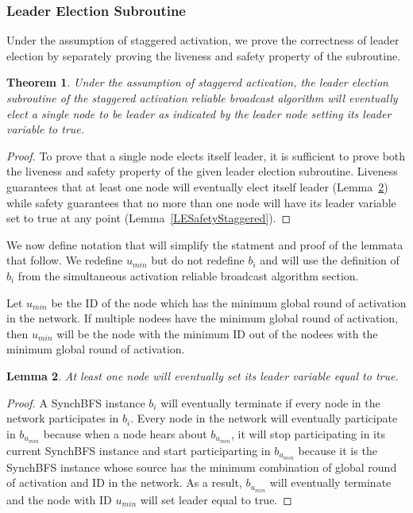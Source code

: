 \documentclass[english]{article}
\newtheorem{theorem}{Theorem}[section]
\newtheorem{lemma}[theorem]{Lemma}
\begin{document}
\subsubsection{Leader Election Subroutine}

Under the assumption of staggered activation, we prove the correctness of leader election by separately proving the liveness and safety property of the subroutine.

\begin{theorem}
\label{LeaderElectionStaggered}
Under the assumption of staggered activation, the leader election subroutine of the staggered activation reliable broadcast algorithm will eventually elect a single node to be leader as indicated by the leader node setting its leader variable to true.
\end{theorem}
\begin{proof}
To prove that a single node elects itself leader, it is sufficient to prove both the liveness and safety property of the given leader election subroutine. Liveness guarantees that at least one node will eventually elect itself leader (Lemma~\ref{LELivenessStaggered}) while safety guarantees that no more than one node will have its leader variable set to true at any point (Lemma~\ref{LESafetyStaggered}).

\end{proof}

We now define notation that will simplify the statment and proof of the lemmata that follow. We redefine $u_{min}$ but do not redefine $b_i$ and will use the definition of $b_i$ from the simultaneous activation reliable broadcast algorithm section.


\begin{definition}
Let $u_{min}$ be the ID of the node which has the minimum global round of activation in the network. If multiple nodees have the minimum global round of activation, then $u_{min}$ will be the node with the minimum ID out of the nodees with the minimum global round of activation.
\end{definition}


\begin{lemma}
\label{LELivenessStaggered}
 At least one node will eventually set its leader variable equal to true.
\end{lemma}
\begin{proof}

A SynchBFS instance $b_i$ will eventually terminate if every node in the network participates in $b_i$. 
Every node in the network will eventually participate in $b_{u_{min}}$ because when a node hears about $b_{u_{min}}$, it will stop participating in its current SynchBFS instance and start participarting in $b_{u_{min}}$ because it is the SynchBFS instance whose source has the minimum combination of global round of activation and ID in the network. As a result, $b_{u_{min}}$ will eventually terminate and the node with ID $u_{min}$ will set leader equal to true.
\end{proof}
\end{document}
